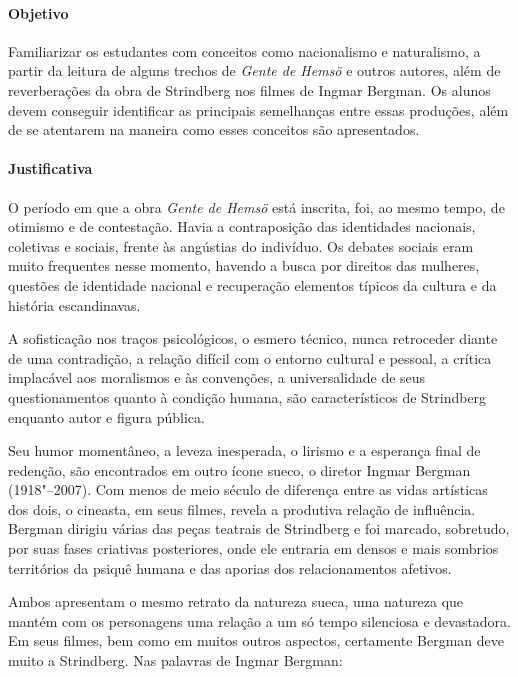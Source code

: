 \documentclass[12pt]{extarticle}
\begin{document}
\paragraph{Objetivo} Familiarizar os estudantes com conceitos como 
nacionalismo e naturalismo, a partir da leitura de alguns trechos de 
\emph{Gente de Hemsö} e outros autores, além de reverberações da obra de 
Strindberg nos filmes de Ingmar Bergman. 
Os alunos devem conseguir identificar as principais semelhanças entre 
essas produções, além de se atentarem na maneira como esses conceitos são apresentados. 


\paragraph{Justificativa} O período em que a obra \emph{Gente de Hemsö} 
está inscrita, foi, ao mesmo tempo, de otimismo e de contestação. Havia a contraposição das identidades nacionais, 
coletivas e sociais, frente às angústias do indivíduo. Os debates sociais 
eram muito frequentes nesse momento, havendo a busca por direitos das 
mulheres, questões de identidade nacional e recuperação elementos típicos 
da cultura e da história escandinavas.

A sofisticação nos traços psicológicos, o esmero técnico, nunca retroceder 
diante de uma contradição, a relação difícil com o entorno cultural e 
pessoal, a crítica implacável aos moralismos e às convenções, a 
universalidade de seus questionamentos quanto à condição humana, são 
característicos de Strindberg enquanto autor e figura pública. 

Seu humor momentâneo, a leveza inesperada, o lirismo e a esperança final 
de redenção, são encontrados em outro ícone sueco, o diretor Ingmar Bergman (1918"--2007). Com menos de meio século de diferença entre as vidas 
artísticas dos dois, o cineasta, em seus filmes, revela a produtiva 
relação de influência. Bergman dirigiu várias das peças teatrais de
Strindberg e foi marcado, sobretudo, por suas fases criativas
posteriores, onde ele entraria em densos e mais sombrios
territórios da psiquê humana e das aporias dos relacionamentos
afetivos.

Ambos apresentam o mesmo retrato da natureza sueca, uma natureza que 
mantém com os personagens uma relação a um só tempo silenciosa e 
devastadora. Em seus filmes, bem como em muitos outros aspectos, 
certamente Bergman deve muito a Strindberg. Nas palavras de Ingmar Bergman: 
\end{document}
